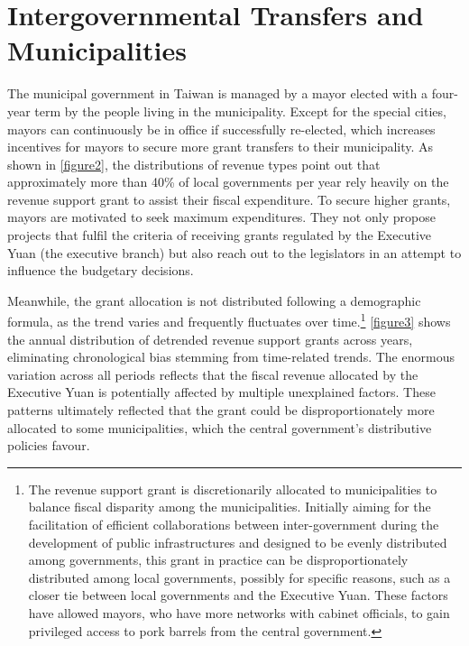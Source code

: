 \section*{\centering Intergovernmental Transfers and Municipalities}
The municipal government in Taiwan is managed by a mayor elected with a four-year term by the people living in the municipality. Except for the special cities, mayors can continuously be in office if successfully re-elected, which increases incentives for mayors to secure more grant transfers to their municipality. As shown in \autoref{figure2}, the distributions of revenue types point out that approximately more than 40\% of local governments per year rely heavily on the revenue support grant to assist their fiscal expenditure. To secure higher grants, mayors are motivated to seek maximum expenditures. They not only propose projects that fulfil the criteria of receiving grants regulated by the Executive Yuan (the executive branch)  but also reach out to the legislators in an attempt to influence the budgetary decisions. 

Meanwhile, the grant allocation is not distributed following a demographic formula, as the trend varies and frequently fluctuates over time.\footnote{The revenue support grant is discretionarily allocated to municipalities to balance fiscal disparity among the municipalities. Initially aiming for the facilitation of efficient collaborations between inter-government during the development of public infrastructures and designed to be evenly distributed among governments, this grant in practice can be disproportionately distributed among local governments, possibly for specific reasons, such as a closer tie between local governments and the Executive Yuan. These factors have allowed mayors, who have more networks with cabinet officials, to gain privileged access to pork barrels from the central government.} \autoref{figure3} shows the annual distribution of detrended revenue support grants across years, eliminating chronological bias stemming from time-related trends. The enormous variation across all periods reflects that the fiscal revenue allocated by the Executive Yuan is potentially affected by multiple unexplained factors. These patterns ultimately reflected that the grant could be disproportionately more allocated to some municipalities, which the central government's distributive policies favour. 

